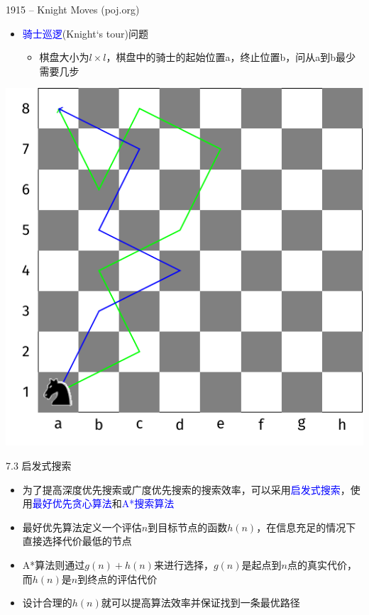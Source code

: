 \begin{frame}{1915 -- Knight Moves (poj.org)}
    \begin{itemize}
        \item \textcolor{blue}{骑士巡逻}(Knight‘s tour)问题
        \begin{itemize}
            \item 棋盘大小为$l\times l$，棋盘中的骑士的起始位置a，终止位置b，问从a到b最少需要几步
        \end{itemize}
    \end{itemize}
    \vfill
    \includegraphics[scale=.7,center]{fig/7-3.pdf}
\end{frame}
\begin{frame}{7.3 启发式搜索}
    \begin{itemize}
        \item 为了提高深度优先搜索或广度优先搜索的搜索效率，可以采用\textcolor{blue}{启发式搜索}，使用\textcolor{blue}{最好优先贪心算法}和\textcolor{blue}{A*搜索算法}
        \item 最好优先算法定义一个评估$n$到目标节点的函数$h(n)$，在信息充足的情况下直接选择代价最低的节点
        \item A*算法则通过$g(n)+h(n)$来进行选择，$g(n)$是起点到$n$点的真实代价，而$h(n)$是$n$到终点的评估代价
        \item 设计合理的$h(n)$就可以提高算法效率并保证找到一条最优路径
    \end{itemize}
\end{frame}
